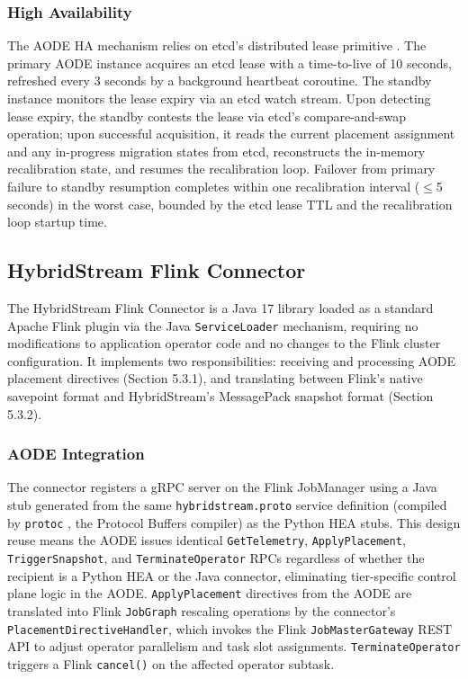 \documentclass[preprint,review,12pt]{elsarticle}
\begin{document}
\subsubsection{High Availability}\label{high-availability}

The AODE HA mechanism relies on etcd's distributed lease primitive \cite{etcd2023}. The primary AODE instance acquires an etcd lease with a time-to-live of 10 seconds, refreshed every 3 seconds by a background heartbeat coroutine. The standby instance monitors the lease expiry via an etcd watch stream. Upon detecting lease expiry, the standby contests the lease via etcd's compare-and-swap operation; upon successful acquisition, it reads the current placement assignment and any in-progress migration states from etcd, reconstructs the in-memory recalibration state, and resumes the recalibration loop. Failover from primary failure to standby resumption completes within one recalibration interval ($\leq$5 seconds) in the worst case, bounded by the etcd lease TTL and the recalibration loop startup time.

\subsection{HybridStream Flink Connector}\label{hybridstream-flink-connector}

The HybridStream Flink Connector is a Java 17 library loaded as a standard Apache Flink plugin via the Java \texttt{ServiceLoader} mechanism, requiring no modifications to application operator code and no changes to the Flink cluster configuration. It implements two responsibilities: receiving and processing AODE placement directives (Section 5.3.1), and translating between Flink's native savepoint format and HybridStream's MessagePack snapshot format (Section 5.3.2).

\subsubsection{AODE Integration}\label{aode-integration}

The connector registers a gRPC server on the Flink JobManager using a Java stub generated from the same \texttt{hybridstream.proto} service definition (compiled by \texttt{protoc} \cite{protobuf2024}, the Protocol Buffers compiler) as the Python HEA stubs. This design reuse means the AODE issues identical \texttt{GetTelemetry}, \texttt{ApplyPlacement}, \texttt{TriggerSnapshot}, and \texttt{TerminateOperator} RPCs regardless of whether the recipient is a Python HEA or the Java connector, eliminating tier-specific control plane logic in the AODE. \texttt{ApplyPlacement} directives from the AODE are translated into Flink \texttt{JobGraph} rescaling operations by the connector's \texttt{PlacementDirectiveHandler}, which invokes the Flink \texttt{JobMasterGateway} REST API to adjust operator parallelism and task slot assignments. \texttt{TerminateOperator} triggers a Flink \texttt{cancel()} on the affected operator subtask.
\end{document}
